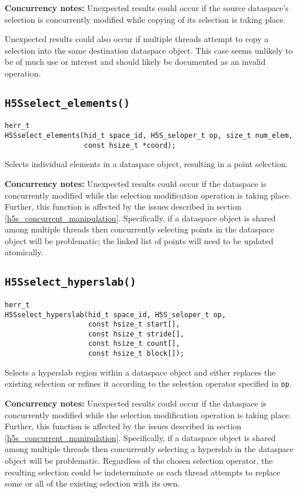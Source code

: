 \documentclass[../HDF5_RFC.tex]{subfiles}
\begin{document}
\textbf{Concurrency notes:} Unexpected results could occur if the source dataspace's selection is
concurrently modified while copying of its selection is taking place.

Unexpected results could also occur if multiple threads attempt to copy a selection into the
same destination dataspace object. This case seems unlikely to be of much use or interest and
should likely be documented as an invalid operation.

\subsection{\texttt{H5Sselect\_elements()}}
\label{apdx:h5s_func_h5sselect_elements}

\begin{verbatim}
herr_t
H5Sselect_elements(hid_t space_id, H5S_seloper_t op, size_t num_elem,
                   const hsize_t *coord);
\end{verbatim}

Selects individual elements in a dataspace object, resulting in a point selection.

\textbf{Concurrency notes:} Unexpected results could occur if the dataspace is concurrently
modified while the selection modification operation is taking place. Further, this function is
affected by the issues described in section \ref{h5s_concurrent_manipulation}. Specifically,
if a dataspace object is shared among multiple threads then concurrently selecting points in the
dataspace object will be problematic; the linked list of points will need to be updated atomically.

\subsection{\texttt{H5Sselect\_hyperslab()}}
\label{apdx:h5s_func_h5sselect_hyperslab}

\begin{verbatim}
herr_t
H5Sselect_hyperslab(hid_t space_id, H5S_seloper_t op,
                    const hsize_t start[],
                    const hsize_t stride[],
                    const hsize_t count[], 
                    const hsize_t block[]);
\end{verbatim}

Selects a hyperslab region within a dataspace object and either replaces the existing selection
or refines it according to the selection operator specified in \texttt{op}.

\textbf{Concurrency notes:} Unexpected results could occur if the dataspace is concurrently
modified while the selection modification operation is taking place. Further, this function is
affected by the issues described in section \ref{h5s_concurrent_manipulation}. Specifically,
if a dataspace object is shared among multiple threads then concurrently selecting a hyperslab in
the dataspace object will be problematic. Regardless of the chosen selection operator, the 
resulting selection could be indeterminate as each thread attempts to replace some or all of the
existing selection with its own.
\end{document}
